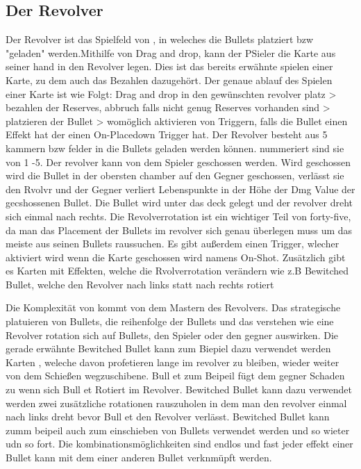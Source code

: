 \subsection{Der Revolver}\label{backpack_and_deck}
Der Revolver ist das Spielfeld von \FF, in weleches die Bullets platziert bzw "geladen" werden.Mithilfe von Drag and drop,
kann der PSieler die Karte aus seiner hand in den Revolver legen. Dies ist das bereits erwähnte spielen einer Karte, zu dem auch das Bezahlen dazugehört.
Der genaue ablauf des Spielen einer Karte ist wie Folgt:
Drag and drop in den gewünschten revolver platz > bezahlen der Reserves, abbruch falls nicht genug Reserves vorhanden sind >
platzieren der Bullet > womöglich aktivieren von Triggern, falls die Bullet einen Effekt hat der einen On-Placedown Trigger hat.
Der  Revolver besteht aus 5 kammern bzw felder in die Bullets geladen werden können. nummeriert sind sie von 1 -5. %
Der revolver kann von dem Spieler geschossen werden. Wird geschossen wird die Bullet in der obersten chamber auf den Gegner geschossen,
verlässt sie den Rvolvr und der Gegner verliert Lebenspunkte in der Höhe der Dmg Value der gecshossenen Bullet.
Die Bullet wird unter das deck gelegt und der revolver dreht sich einmal nach rechts.
Die Revolverrotation ist ein wichtiger Teil von forty-five, da man das Placement der Bullets
im revolver sich genau überlegen muss um das meiste aus seinen Bullets raussuchen. %
Es gibt außerdem einen Trigger, wlecher aktiviert wird wenn die Karte geschossen wird namens On-Shot.
Zusätzlich gibt es Karten mit Effekten, welche die Rvolverrotation verändern wie z.B Bewitched Bullet, welche den Revolver nach links statt nach rechts rotiert

Die Komplexität von \FF kommt von dem Mastern des Revolvers. Das strategische platuieren von Bullets,
die reihenfolge der Bullets und das verstehen wie eine Revolver rotation sich auf Bullets, den Spieler oder den gegner auswirken.
Die gerade erwähnte Bewitched Bullet kann zum Biepiel dazu verwendet werden Karten , weleche davon profetieren lange im revolver zu bleiben,
wieder weiter von dem Schießen wegzuschibene. Bull et zum Beipeil fügt dem gegner Schaden zu wenn sich Bull et Rotiert im Revolver. %
Bewitched Bullet kann dazu verwendet werden zwei zusätzliche rotationen rauszuholen in dem man den revolver einmal nach links dreht bevor Bull et den Revolver verlässt.
Bewitched Bullet kann zumm beipeil auch zum einschieben von Bullets verwendet werden und so wieter udn so fort.
Die kombinationsmöglichkeiten sind endlos und fast jeder effekt einer Bullet kann mit dem einer anderen Bullet verknmüpft werden.



